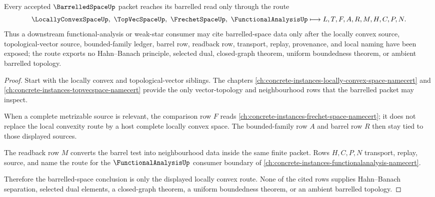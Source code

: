 \begin{theorem}
\label{thm:barrelled-space-locally-convex-route}
Every accepted $\BarrelledSpaceUp$ packet reaches its barrelled read only through the route
$$
\LocallyConvexSpaceUp,\ \TopVecSpaceUp,\ \FrechetSpaceUp,\ \FunctionalAnalysisUp
\longmapsto
L,T,F,A,R,M,H,C,P,N .
$$
Thus a downstream functional-analysis or weak-star consumer may cite barrelled-space data only after the locally convex source, topological-vector source, bounded-family ledger, barrel row, readback row, transport, replay, provenance, and local naming have been exposed; the route exports no Hahn--Banach principle, selected dual, closed-graph theorem, uniform boundedness theorem, or ambient barrelled topology.
\end{theorem}
\begin{proof}
Start with the locally convex and topological-vector siblings. The chapters \autoref{ch:concrete-instances-locally-convex-space-namecert} and \autoref{ch:concrete-instances-topvecspace-namecert} provide the only vector-topology and neighbourhood rows that the barrelled packet may inspect.

When a complete metrizable source is relevant, the comparison row $F$ reads \autoref{ch:concrete-instances-frechet-space-namecert}; it does not replace the local convexity route by a host complete locally convex space. The bounded-family row $A$ and barrel row $R$ then stay tied to those displayed sources.

The readback row $M$ converts the barrel test into neighbourhood data inside the same finite packet. Rows $H,C,P,N$ transport, replay, source, and name the route for the $\FunctionalAnalysisUp$ consumer boundary of \autoref{ch:concrete-instances-functionalanalysis-namecert}.

Therefore the barrelled-space conclusion is only the displayed locally convex route. None of the cited rows supplies Hahn--Banach separation, selected dual elements, a closed-graph theorem, a uniform boundedness theorem, or an ambient barrelled topology.
\end{proof}


